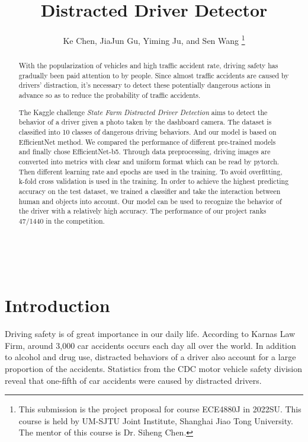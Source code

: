 \documentclass[final]{cvpr}
\begin{document}
\title{Distracted Driver Detector}

\author{
  Ke Chen, JiaJun Gu, Yiming Ju, and Sen Wang
\thanks{
This submission is the project proposal for course ECE4880J in 2022SU. This course is held by UM-SJTU Joint Institute, Shanghai Jiao Tong University. The mentor of this course is Dr. Siheng Chen.
}}

\maketitle


\begin{abstract}
    With the popularization of vehicles and high traffic accident rate, driving safety has gradually been paid attention to by people. Since almost traffic accidents are caused by drivers' distraction, it's necessary to detect these potentially dangerous actions in advance so as to reduce the probability of traffic accidents.
    
   The Kaggle challenge \textit{State Farm Distracted Driver Detection} aims to detect the behavior of a driver given a photo taken by the dashboard camera. The dataset is classified into 10 classes of dangerous driving behaviors. And our model is based on EfficientNet method. We compared the performance of different pre-trained models and finally chose EfficientNet-b5. Through data preprocessing, driving images are converted into metrics with clear and uniform format which can be read by pytorch. Then different learning rate and epochs are used in the training. To avoid overfitting, k-fold cross validation is used in the training. In order to achieve the highest predicting accuracy on the test dataset, we trained a classifier and take the interaction between human and objects into account. Our model can be used to recognize the behavior of the driver with a relatively high accuracy. The performance of our project ranks 47/1440 in the competition.
\end{abstract}
\\
\section{Introduction}
Driving safety is of great importance in our daily life. According to Karnas Law Firm, around 3,000 car accidents occurs each day all over the world. In addition to alcohol and drug use, distracted behaviors of a driver also account for a large proportion of the accidents. Statistics from the CDC motor vehicle safety division reveal that one-fifth of car accidents were caused by distracted drivers.
\end{document}
